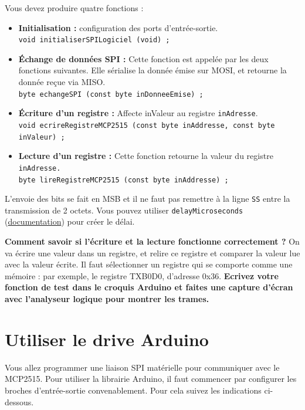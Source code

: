 \documentclass[11pt]{paper}
\begin{document}
Vous devez produire quatre fonctions :
\begin{itemize}
	\item {\bf Initialisation :} configuration des ports d'entrée-sortie.\\
	{\tt void initialiserSPILogiciel (void) ;}
	
	\item {\bf  Échange de données SPI :} Cette fonction est appelée par les deux fonctions suivantes. Elle sérialise la donnée émise sur MOSI, et retourne la donnée reçue via MISO.\\
	{\tt byte echangeSPI (const byte inDonneeEmise) ;}

	\item {\bf Écriture d'un registre :} Affecte inValeur au registre {\tt inAdresse}.\\
	{\tt void ecrireRegistreMCP2515 (const byte inAddresse, const byte inValeur) ;}

	\item {\bf Lecture d'un registre :} Cette fonction retourne la valeur du registre {\tt inAdresse.}\\
	{\tt  byte lireRegistreMCP2515 (const byte inAddresse) ;}
\end{itemize}
\bigskip

L'envoie des bits se fait en MSB et il ne faut pas remettre à la ligne {\tt SS} entre la transmission de 2 octets.
Vous pouvez utiliser {\tt delayMicroseconds} (\href{https://www.arduino.cc/reference/en/language/functions/time/delaymicroseconds/}{documentation}) pour créer le délai.

{\bf Comment savoir si l'écriture et la lecture fonctionne correctement ?} On va écrire une valeur dans un registre, et relire ce registre et comparer la valeur lue avec la valeur écrite. Il faut sélectionner un registre qui se comporte comme une mémoire : par exemple, le registre TXB0D0, d'adresse 0x36. {\bf Ecrivez votre fonction de test dans le croquis Arduino et faites une capture d'écran avec l'analyseur logique pour montrer les trames.}


  \section{Utiliser le drive Arduino}

	Vous allez programmer une liaison SPI matérielle pour communiquer avec le MCP2515. Pour utiliser la librairie Arduino, il faut commencer par configurer les broches d'entrée-sortie convenablement. Pour cela suivez les indications ci-dessous.
\end{document}
